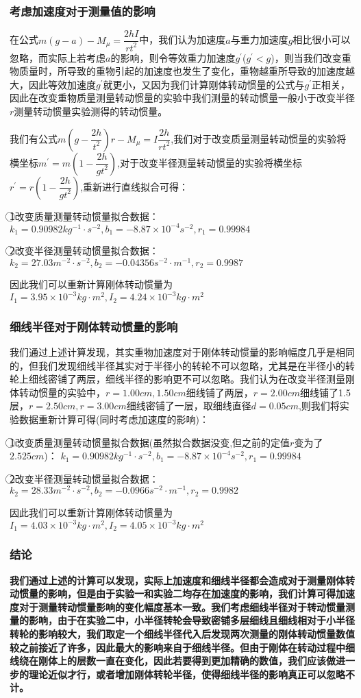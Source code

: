 \documentclass[a4 paper,12pt]{article}
\begin{document}
\subsubsection{考虑加速度对于测量值的影响}
在公式$m(g-a)-M_{\mu}=\dfrac{2hI}{rt^{2}}$中，我们认为加速度$a$与重力加速度$g$相比很小可以忽略，而实际上若考虑$a$的影响，则令等效重力加速度$g^{\prime}$($g^{\prime}<g$)，则当我们改变重物质量时，所导致的重物引起的加速度也发生了变化，重物越重所导致的加速度越大，因此等效加速度$g^{\prime}$就更小，又因为我们计算刚体转动惯量的公式与$g^{\prime}$正相关，因此在改变重物质量测量转动惯量的实验中我们测量的转动惯量一般小于改变半径$r$测量转动惯量实验测得的转动惯量。
\par 我们有公式$m(g-\dfrac{2h}{t^{2}})r-M_{\mu}=I\dfrac{2h}{rt^{2}}$,我们对于改变质量测量转动惯量的实验将横坐标$m^{\prime}=m(1-\dfrac{2h}{gt^{2}})$,对于改变半径测量转动惯量的实验将横坐标$r^{\prime}=r(1-\dfrac{2h}{gt^{2}})$,重新进行直线拟合可得：
\par \textcircled{1}改变质量测量转动惯量拟合数据： $k_{1}=0.90982kg^{-1}\cdot s^{-2},b_{1}=-8.87\times10^{-4}s^{-2},r_{1}=0.99984$
\par \textcircled{2}改变半径测量转动惯量拟合数据：$k_{2}=27.03m^{-2}\cdot s^{-2},b_{2}=-0.04356s^{-2}\cdot m^{-1},r_{2}=0.9987$
\par 因此我们可以重新计算刚体转动惯量为$I_{1}=3.95\times10^{-3}kg\cdot m^{2},I_{2}=4.24\times10^{-3}kg\cdot m^{2}$
\subsubsection{细线半径对于刚体转动惯量的影响}
我们通过上述计算发现，其实重物加速度对于刚体转动惯量的影响幅度几乎是相同的，但我们发现细线半径其实对于半径小的转轮不可以忽略，尤其是在半径小的转轮上细线密铺了两层，细线半径的影响更不可以忽略。我们认为在改变半径测量刚体转动惯量的实验中，$r=1.00cm,1.50cm$细线铺了两层，$r=2.00cm$细线铺了1.5层，$r=2.50cm,r=3.00cm$细线密铺了一层，取细线直径$d=0.05cm$,则我们将实验数据重新计算可得(同时考虑加速度的影响)：
\par \textcircled{1}改变质量测量转动惯量拟合数据(虽然拟合数据没变,但之前的定值$r$变为了$2.525cm$)： $k_{1}=0.90982kg^{-1}\cdot s^{-2},b_{1}=-8.87\times10^{-4}s^{-2},r_{1}=0.99984$
\par \textcircled{2}改变半径测量转动惯量拟合数据：$k_{2}=28.33m^{-2}\cdot s^{-2},b_{2}=-0.0966s^{-2}\cdot m^{-1},r_{2}=0.9982$
\par 因此我们可以重新计算刚体转动惯量为$I_{1}=4.03\times10^{-3}kg\cdot m^{2},I_{2}=4.05\times10^{-3}kg\cdot m^{2}$
\subsubsection{结论}
\textbf{我们通过上述的计算可以发现，实际上加速度和细线半径都会造成对于测量刚体转动惯量的影响，但是由于实验一和实验二均存在加速度的影响，我们计算可得加速度对于测量转动惯量影响的变化幅度基本一致。我们考虑细线半径对于转动惯量测量的影响，由于在实验二中，小半径转轮会导致密铺多层细线且细线相对于小半径转轮的影响较大，我们取定一个细线半径代入后发现两次测量的刚体转动惯量数值较之前接近了许多，因此最大的影响来自于细线半径。但由于刚体在转动过程中细线绕在刚体上的层数一直在变化，因此若要得到更加精确的数值，我们应该做进一步的理论近似才行，或者增加刚体转轮半径，使得细线半径的影响真正可以忽略不计。}
\end{document}
